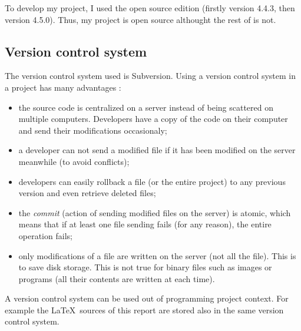 To develop my project, I used the open source edition (firstly version 4.4.3,
then version 4.5.0). Thus, my project is open source althought the rest of \cf
is not.

\subsection{Version control system}

The version control system used is Subversion. Using a version control system in
a project has many advantages :
\begin{itemize}
 \item the source code is centralized on a server instead of being scattered on
multiple computers. Developers have a copy of the code on their computer and
send their modifications occasionaly;
 \item a developer can not send a modified file if it has been modified on the
server meanwhile (to avoid conflicts);
 \item developers can easily rollback a file (or the entire project) to any
previous version and even retrieve deleted files; 
 \item the \textit{commit} (action of sending modified files on the server) is
atomic, which means that if at least one file sending fails (for any reason),
the entire operation fails;
 \item only modifications of a file are written on the server (not all the
file). This is to save disk storage. This is not true for binary files such as
images or programs (all their contents are written at each time).

\end{itemize}

A version control system can be used out of programming project context. For
example the \LaTeX\ sources of this report are stored also in the same version
control system.\\
